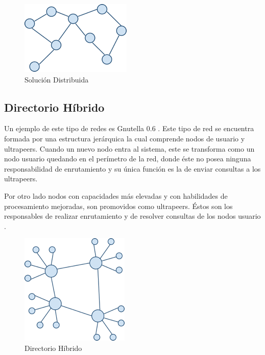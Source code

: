 \begin{figure}[h]
  \centering
    \includegraphics[scale=1]{gfx/p2p_distribuido}
  \caption{Solución Distribuida}
  \label{p2p_distribuido}
\end{figure}


\subsection{Directorio Híbrido}

Un ejemplo de este tipo de redes es Gnutella 0.6 \cite{sanghi}. Este tipo de red se encuentra formada por una estructura jerárquica la cual comprende nodos de usuario y ultrapeers. Cuando un nuevo nodo entra al sistema, este se transforma como un nodo usuario quedando en el perímetro de la red, donde éste no posea ninguna responsabilidad de enrutamiento y su única función es la de enviar consultas a los ultrapeers. 

Por otro lado nodos con capacidades más elevadas y con habilidades de procesamiento mejoradas, son promovidos como ultrapeers. Éstos son los responsables de realizar enrutamiento y de resolver consultas de los nodos usuario \cite{sanghi}. 

\begin{figure}[h]
  \centering
    \includegraphics[scale=1]{gfx/p2p_dir_centralizado}
  \caption{Directorio Híbrido}
  \label{p2p_dir_centralizado}
\end{figure}


